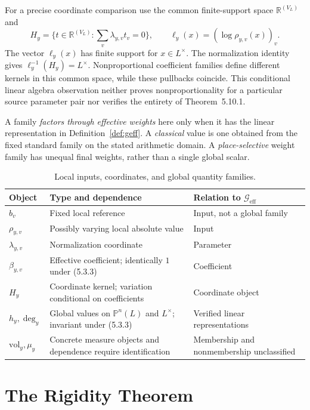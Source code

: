 \documentclass[11pt,a4paper]{article}
\theoremstyle{definition}
\theoremstyle{remark}
\newcommand{\Geff}{\mathcal{G}_{\mathrm{eff}}}
\begin{document}
For a precise coordinate comparison use the common finite-support space
$\mathbb R^{(V_L)}$ and
\[
H_y=\{t\in\mathbb R^{(V_L)}:\sum_v\lambda_{y,v}t_v=0\},
\qquad \ell_y(x)=(\log\rho_{y,v}(x))_v.
\]
The vector $\ell_y(x)$ has finite support for $x\in L^\times$.
The normalization identity gives $\ell_y^{-1}(H_y)=L^\times$.
Nonproportional coefficient families define different kernels in this
common space, while these pullbacks coincide. This conditional linear
algebra observation neither proves nonproportionality for a particular
source parameter pair nor verifies the entirety of Theorem~5.10.1.

A family \emph{factors through effective weights} here only when it has the
linear representation in Definition~\ref{def:geff}.
A \emph{classical} value is one obtained from the fixed standard family
on the stated arithmetic domain. A \emph{place-selective} weight family
has unequal final weights, rather than a single global scalar.

\begin{table}[htbp]
\centering\small
\caption{Local inputs, coordinates, and global quantity families.}\label{tab:type_glossary}
\begin{tabularx}{\textwidth}{@{}lXX@{}}
\toprule
Object & Type and dependence & Relation to $\Geff$\\
\midrule
$b_v$ & Fixed local reference & Input, not a global family\\
$\rho_{y,v}$ & Possibly varying local absolute value & Input\\
$\lambda_{y,v}$ & Normalization coordinate & Parameter\\
$\beta_{y,v}$ & Effective coefficient; identically $1$ under (5.3.3) & Coefficient\\
$H_y$ & Coordinate kernel; variation conditional on coefficients & Coordinate object\\
$h_y,\deg_y$ & Global values on $\mathbb P^n(L)$ and $L^\times$; invariant under (5.3.3) & Verified linear representations\\
$\mathrm{vol}_y,\mu_y$ & Concrete measure objects and dependence require identification & Membership and nonmembership unclassified\\
\bottomrule
\end{tabularx}
\end{table}

\section{The Rigidity Theorem}\label{sec:rigidity}
\end{document}
